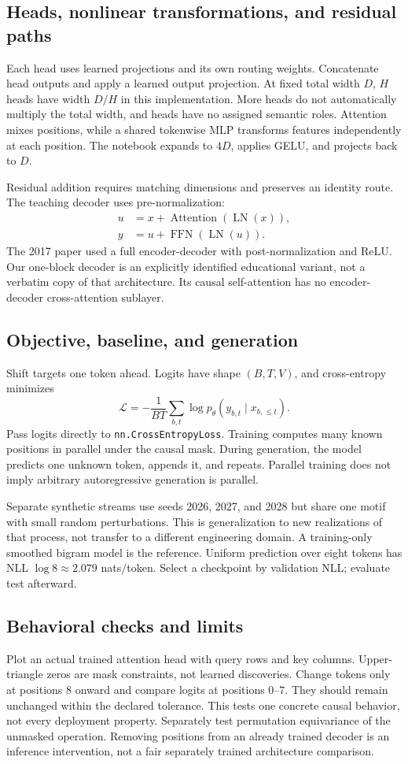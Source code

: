 \documentclass[11pt,oneside]{book}
\begin{document}
\subsection{Heads, nonlinear transformations, and residual paths}
Each head uses learned projections and its own routing weights. Concatenate
head outputs and apply a learned output projection. At fixed total width
$D$, $H$ heads have width $D/H$ in this implementation. More heads do not
automatically multiply the total width, and heads have no assigned semantic
roles. Attention mixes positions, while a shared tokenwise MLP transforms
features independently at each position. The notebook expands to $4D$,
applies GELU, and projects back to $D$.

Residual addition requires matching dimensions and preserves an identity
route. The teaching decoder uses pre-normalization:
\begin{align*}
u&=x+\operatorname{Attention}(\operatorname{LN}(x)),\\
y&=u+\operatorname{FFN}(\operatorname{LN}(u)).
\end{align*}
The 2017 paper used a full encoder-decoder with post-normalization and
ReLU. Our one-block decoder is an explicitly identified educational
variant, not a verbatim copy of that architecture. Its causal self-attention
has no encoder-decoder cross-attention sublayer.

\subsection{Objective, baseline, and generation}
Shift targets one token ahead. Logits have shape $(B,T,V)$, and
cross-entropy minimizes
\[\mathcal L=-\frac1{BT}\sum_{b,t}\log p_\theta(y_{b,t}\mid x_{b,\le t}).\]
Pass logits directly to \texttt{nn.CrossEntropyLoss}. Training computes
many known positions in parallel under the causal mask. During generation,
the model predicts one unknown token, appends it, and repeats. Parallel
training does not imply arbitrary autoregressive generation is parallel.

Separate synthetic streams use seeds 2026, 2027, and 2028 but share one
motif with small random perturbations. This is generalization to new
realizations of that process, not transfer to a different engineering
domain. A training-only smoothed bigram model is the reference. Uniform
prediction over eight tokens has NLL $\log 8\approx2.079$ nats/token.
Select a checkpoint by validation NLL; evaluate test afterward.

\subsection{Behavioral checks and limits}
Plot an actual trained attention head with query rows and key columns.
Upper-triangle zeros are mask constraints, not learned discoveries.
Change tokens only at positions 8 onward and compare logits at positions
0--7. They should remain unchanged within the declared tolerance.
This tests one concrete causal behavior, not every deployment property.
Separately test permutation equivariance of the unmasked operation.
Removing positions from an already trained decoder is an inference
intervention, not a fair separately trained architecture comparison.
\end{document}
